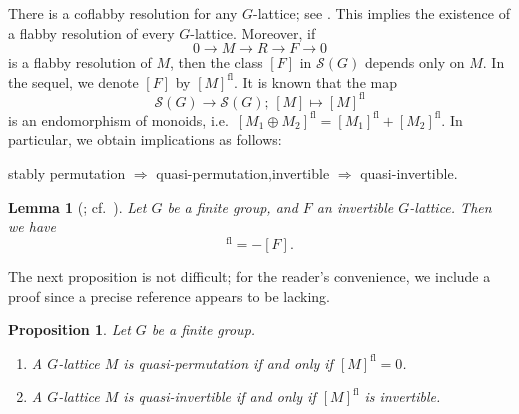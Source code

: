 \documentclass[12pt]{amsart}
\theoremstyle{plain}
\newtheorem{prop}[thm]{Proposition}
\newtheorem{lem}[thm]{Lemma}
\theoremstyle{definition}
\numberwithin{thm}{section}
\numberwithin{equation}{section}
\newcommand{\sS}{\mathscr{S}}
\DeclareMathOperator{\fl}{fl}
\begin{document}
There is a coflabby resolution for any $G$-lattice; see \cite[Lemma 1.1]{Endo1975}. 
This implies the existence of a flabby resolution of every $G$-lattice. Moreover, if 
\begin{equation*}
0\rightarrow M \rightarrow R \rightarrow F \rightarrow 0
\end{equation*}
is a flabby resolution of $M$, then the class $[F]$ in $\sS(G)$ depends only on $M$. In the sequel, we denote $[F]$ by $[M]^{\fl}$. It is known that the map
\begin{equation*}
    \sS(G)\rightarrow \sS(G);\,[M]\mapsto [M]^{\fl}
\end{equation*}
is an endomorphism of monoids, i.e.~$[M_1\oplus M_2]^{\fl}=[M_1]^{\fl}+[M_2]^{\fl}$.
In particular, we obtain implications as follows: 
\begin{center}
    stably permutation $\Rightarrow$ quasi-permutation,\quad invertible $\Rightarrow$ quasi-invertible. 
\end{center}

\begin{lem}[{\cite[Lemma 2.7.1 (a)]{Lorenz2005}; cf.~\cite[(1.2) Proposition]{Lenstra1974}}]\label{lem:ivmo}
Let $G$ be a finite group, and $F$ an invertible $G$-lattice. Then we have
\begin{equation*}
    [F]^{\fl}=-[F]. 
\end{equation*}
\end{lem}

The next proposition is not difficult; for the reader's convenience, we include a proof since a precise reference appears to be lacking.

\begin{prop}\label{prop:edlr}
Let $G$ be a finite group. 
\begin{enumerate}
\item A $G$-lattice $M$ is quasi-permutation if and only if $[M]^{\fl}=0$. 
\item A $G$-lattice $M$ is quasi-invertible if and only if $[M]^{\fl}$ is invertible. 
\end{enumerate}
\end{prop}
\end{document}
